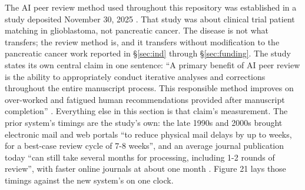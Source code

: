 The AI peer review method used throughout this repository was established in a
study deposited November 30, 2025 \cite{aiprgliomatc}. That study was about
clinical trial patient matching in glioblastoma, not pancreatic cancer. The
disease is not what transfers; the review method is, and it transfers without
modification to the pancreatic cancer work reported in \S\ref{sec:ind} through
\S\ref{sec:funding}. The study states its own central claim in one sentence: ``A
primary benefit of AI peer review is the ability to appropriately conduct
iterative analyses and corrections throughout the entire manuscript process.
This responsible method improves on over-worked and fatigued human
recommendations provided after manuscript completion'' \cite{aiprgliomatc}.
Everything else in this section is that claim's measurement. The prior system's
timings are the study's own: the late 1990s and 2000s brought electronic mail
and web portals ``to reduce physical mail delays by up to weeks, for a best-case
review cycle of 7-8 weeks'', and an average journal publication today ``can
still take several months for processing, including 1-2 rounds of review'', with
faster online journals at about one month \cite{aiprgliomatc}. Figure 21 lays
those timings against the new system's on one clock.

